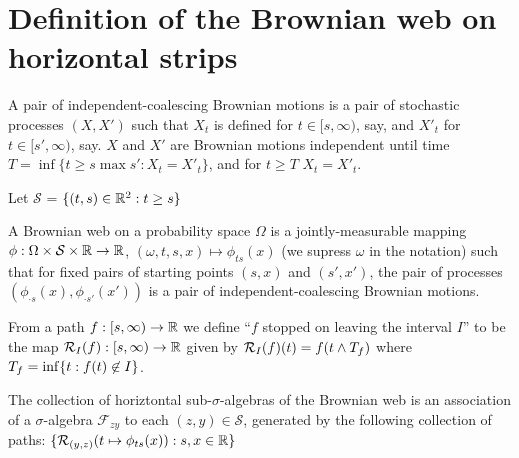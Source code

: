 {
\newcommand{\factor}[2]{\mathcal{F}_{#1 #2}}
\newcommand{\commafactor}[2]{\mathcal{F}_{#1,#2}}
\newcommand{\simplex}{\mathcal{S}}

\section{Definition of the Brownian web on horizontal strips}

\begin{definition}
  A pair of independent-coalescing Brownian motions is a pair of
  stochastic processes $(X, X')$ such that $X_t$ is defined for $t \in
  [s, \infty)$, say, and $X'_t$ for $t \in [s', \infty)$, say.  $X$
      and $X'$ are Brownian motions independent until time $T = \inf
      \{ t \ge s \max s' : X_t = X'_t\}$, and for $t \ge T$ $X_t =
      X'_t$.
\end{definition}

\begin{definition}
  Let $\simplex$ = $\{(t, s) \in \mathbb{R}^2 : t \ge s\}$
\end{definition}

\newcommand{\webnoargs}{\phi}
\newcommand{\web}[2]{\webnoargs_{#1}(#2)}

\begin{definition}
  A Brownian web on a probability space $\Omega$ is a
  jointly-measurable mapping $\webnoargs : \Omega \cross \simplex \cross
  \R \to \R$, $(\omega, t, s, x) \mapsto \web{ts}{x}$ (we supress
  $\omega$ in the notation) such that for fixed pairs of starting
  points $(s, x)$ and $(s', x')$, the pair of processes $(\web{\cdot
    s}{x}, \web{\cdot s'}{x'})$ is a pair of independent-coalescing
  Brownian motions.
\end{definition}

\begin{definition}
  \newcommand{\T}{\stripleavetime{f}}
  \label{def:restrict}
  From a path $f : [s, \infty) \to \mathbb{R}$ we define ``$f$ stopped on
    leaving the interval $I$'' to be the map $\mathcal{R}_{I}(f) : [s,
      \infty) \to \mathbb{R}$ given by $\restrict{I}{f}(t) = f(t \minsym \T)$
      where $\T = \inf\{ t : f(t) \not\in I \}$.
\end{definition}

\newcommand{\brownianwebnoise}{collection of horiztontal
  sub-$\sigma$-algebras of the Brownian web}

\begin{definition}
  The \brownianwebnoise{} is an
  association of a $\sigma$-algebra $\factor{z}{y}$ to each $(z, y)
  \in \simplex$, generated by the following collection of paths:
  $\{ \restrict{(y,z)}{t \mapsto \web{ts}{x}} : s, x \in \R \}$
\end{definition}

}
